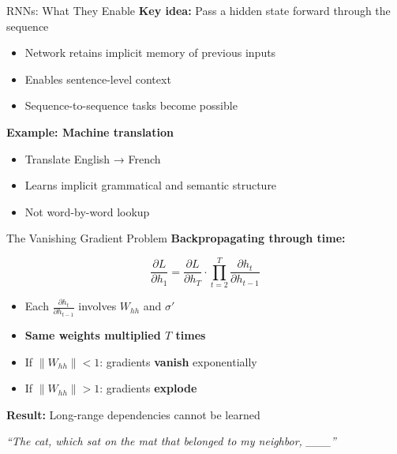 \begin{frame}{RNNs: What They Enable}
    \textbf{Key idea:} Pass a hidden state forward through the sequence
    
    \vspace{1em}
    \begin{itemize}
        \item Network retains implicit memory of previous inputs
        \item Enables sentence-level context
        \item Sequence-to-sequence tasks become possible
    \end{itemize}
    
    \vspace{1em}
    \textbf{Example: Machine translation}
    \begin{itemize}
        \item Translate English → French
        \item Learns implicit grammatical and semantic structure
        \item Not word-by-word lookup
    \end{itemize}
\end{frame}

\begin{frame}{The Vanishing Gradient Problem}
    \textbf{Backpropagating through time:}
    
    \vspace{0.5em}
    $$\frac{\partial L}{\partial h_1} = \frac{\partial L}{\partial h_T} \cdot \prod_{t=2}^{T} \frac{\partial h_t}{\partial h_{t-1}}$$
    
    \vspace{1em}
    \begin{itemize}
        \item Each $\frac{\partial h_t}{\partial h_{t-1}}$ involves $W_{hh}$ and $\sigma'$
        \item \textbf{Same weights multiplied $T$ times}
        \item If $\|W_{hh}\| < 1$: gradients \textbf{vanish} exponentially
        \item If $\|W_{hh}\| > 1$: gradients \textbf{explode}
    \end{itemize}
    
    \vspace{1em}
    \textbf{Result:} Long-range dependencies cannot be learned
    
    \vspace{0.5em}
    \small\textit{``The cat, which sat on the mat that belonged to my neighbor, \_\_\_''}
\end{frame}


